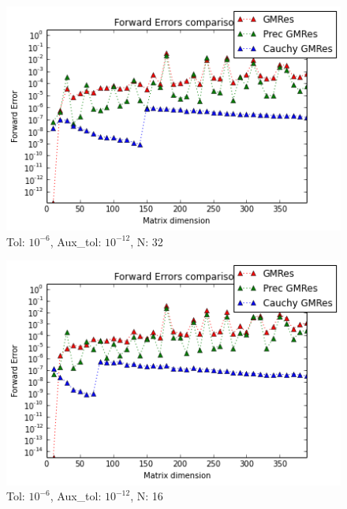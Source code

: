 \documentclass[fleqn]{article}
\begin{document}
\begin{figure}[ht]
    \centering
    \includegraphics[scale=0.4]{images/x2.png}
    \caption{Tol: $10^{-6}$, Aux\_tol: $10^{-12}$, N: 32   }
    \label{fig:14}
\end{figure}
\newpage
\begin{figure}[ht]
    \centering
    \includegraphics[scale=0.4]{images/x3.png}
    \caption{Tol: $10^{-6}$, Aux\_tol: $10^{-12}$, N: 16}
    \label{fig:15}
\end{figure}
\end{document}
